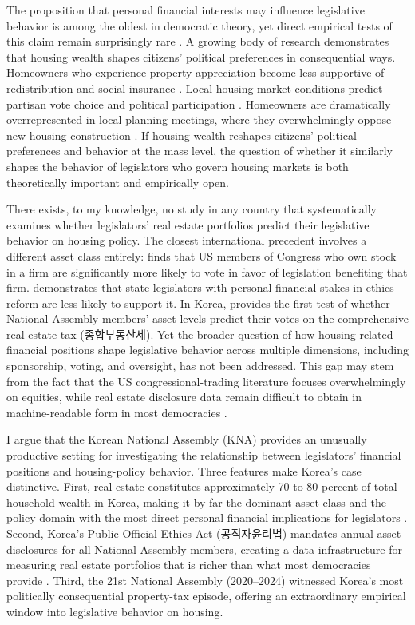 \documentclass[11pt]{article}
\begin{document}
The proposition that personal financial interests may influence legislative behavior is among the oldest in democratic theory, yet direct empirical tests of this claim remain surprisingly rare \citep{carnesLupu2023}. A growing body of research demonstrates that housing wealth shapes citizens' political preferences in consequential ways. Homeowners who experience property appreciation become less supportive of redistribution and social insurance \citep{ansell2014}. Local housing market conditions predict partisan vote choice and political participation \citep{larsen2019}. Homeowners are dramatically overrepresented in local planning meetings, where they overwhelmingly oppose new housing construction \citep{einstein2019}. If housing wealth reshapes citizens' political preferences and behavior at the mass level, the question of whether it similarly shapes the behavior of legislators who govern housing markets is both theoretically important and empirically open.

There exists, to my knowledge, no study in any country that systematically examines whether legislators' real estate portfolios predict their legislative behavior on housing policy. The closest international precedent involves a different asset class entirely: \citet{tahoun2014} finds that US members of Congress who own stock in a firm are significantly more likely to vote in favor of legislation benefiting that firm. \citet{rosenson2003} demonstrates that state legislators with personal financial stakes in ethics reform are less likely to support it. In Korea, \citet{seo2025} provides the first test of whether National Assembly members' asset levels predict their votes on the comprehensive real estate tax (종합부동산세). Yet the broader question of how housing-related financial positions shape legislative behavior across multiple dimensions, including sponsorship, voting, and oversight, has not been addressed. This gap may stem from the fact that the US congressional-trading literature focuses overwhelmingly on equities, while real estate disclosure data remain difficult to obtain in machine-readable form in most democracies \citep{carnes2015, fisman2014}.

I argue that the Korean National Assembly (KNA) provides an unusually productive setting for investigating the relationship between legislators' financial positions and housing-policy behavior. Three features make Korea's case distinctive. First, real estate constitutes approximately 70 to 80 percent of total household wealth in Korea, making it by far the dominant asset class and the policy domain with the most direct personal financial implications for legislators \citep{schwartz2012}. Second, Korea's Public Official Ethics Act (공직자윤리법) mandates annual asset disclosures for all National Assembly members, creating a data infrastructure for measuring real estate portfolios that is richer than what most democracies provide \citep{cho2021, haLee2023}. Third, the 21st National Assembly (2020--2024) witnessed Korea's most politically consequential property-tax episode, offering an extraordinary empirical window into legislative behavior on housing.
\end{document}
